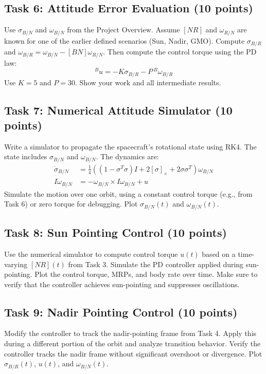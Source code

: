 \documentclass[12pt]{article}
\begin{document}
\subsection{Task 6: Attitude Error Evaluation (10 points)}
Use \(\sigma_{B/N}\) and \(\omega_{B/N}\) from the Project Overview. Assume \([NR]\) and \(\omega_{R/N}\) are known for one of the earlier defined scenarios (Sun, Nadir, GMO). Compute \(\sigma_{B/R}\) and \(\omega_{B/R} = \omega_{B/N} - [BN]\omega_{R/N}\). Then compute the control torque using the PD law:
\[
{}^B\!u = -K\sigma_{B/R} - P\,{}^B\omega_{B/R}
\]
Use \(K = 5\) and \(P = 30\). Show your work and all intermediate results.

\subsection{Task 7: Numerical Attitude Simulator (10 points)}
Write a simulator to propagate the spacecraft's rotational state using RK4. The state includes \(\sigma_{B/N}\) and \(\omega_{B/N}\). The dynamics are:
\begin{align}
\dot{\sigma}_{B/N} &= \frac{1}{4} \left( (1 - \sigma^T\sigma)I + 2[\sigma]_\times + 2\sigma\sigma^T \right) \omega_{B/N} \\
I\dot{\omega}_{B/N} &= -\omega_{B/N} \times I\omega_{B/N} + u
\end{align}
Simulate the motion over one orbit, using a constant control torque (e.g., from Task 6) or zero torque for debugging. Plot \(\sigma_{B/N}(t)\) and \(\omega_{B/N}(t)\).

\subsection{Task 8: Sun Pointing Control (10 points)}
Use the numerical simulator to compute control torque \(u(t)\) based on a time-varying \([NR](t)\) from Task 3. Simulate the PD controller applied during sun-pointing. Plot the control torque, MRPs, and body rate over time. Make sure to verify that the controller achieves sun-pointing and suppresses oscillations.

\subsection{Task 9: Nadir Pointing Control (10 points)}
Modify the controller to track the nadir-pointing frame from Task 4. Apply this during a different portion of the orbit and analyze transition behavior. Verify the controller tracks the nadir frame without significant overshoot or divergence. Plot \(\sigma_{B/R}(t)\), \(u(t)\), and \(\omega_{B/N}(t)\).
\end{document}

